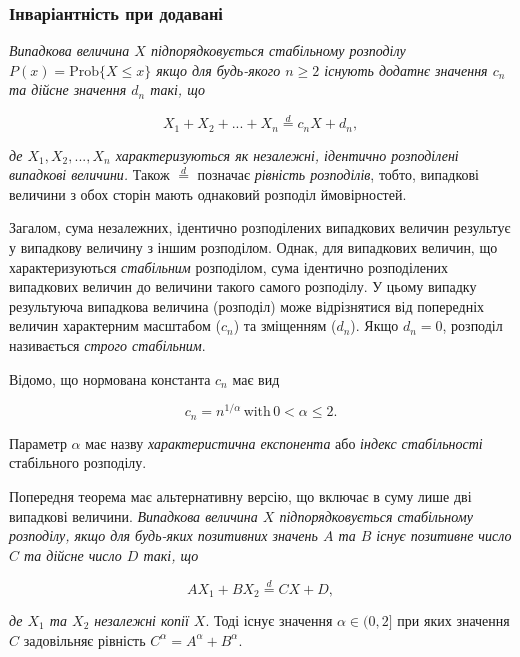 \documentclass[
  letterpaper,
]{report}
\begin{document}
\hypertarget{ux456ux43dux432ux430ux440ux456ux430ux43dux442ux43dux456ux441ux442ux44c-ux43fux440ux438-ux434ux43eux434ux430ux432ux430ux43dux456}{%
\subsubsection{Інваріантність при
додавані}\label{ux456ux43dux432ux430ux440ux456ux430ux43dux442ux43dux456ux441ux442ux44c-ux43fux440ux438-ux434ux43eux434ux430ux432ux430ux43dux456}}

\emph{Випадкова величина \(X\) підпорядковується стабільному розподілу
\(P(x) = \text{Prob}\{X \leq x\}\) якщо для будь-якого \(n \geq 2\)
існують додатнє значення \(c_{n}\) та дійсне значення \(d_{n}\) такі,
що}

\[ 
X_1 + X_2 + ... + X_n \stackrel{d}{=} c_{n}X + d_{n}, 
\]

\emph{де \(X_1, X_2, ..., X_n\) характеризуються як незалежні, ідентично
розподілені випадкові величини.} Також \(\stackrel{d}{=}\) позначає
\emph{рівність розподілів}, тобто, випадкові величини з обох сторін
мають однаковий розподіл ймовірностей.

Загалом, сума незалежних, ідентично розподілених випадкових величин
результує у випадкову величину з іншим розподілом. Однак, для випадкових
величин, що характеризуються \emph{стабільним} розподілом, сума
ідентично розподілених випадкових величин до величини такого самого
розподілу. У цьому випадку результуюча випадкова величина (розподіл)
може відрізнятися від попередніх величин характерним масштабом
(\(c_{n}\)) та зміщенням (\(d_{n}\)). Якщо \(d_{n} = 0\), розподіл
називається \emph{строго стабільним}.

Відомо, що нормована константа \(c_{n}\) має вид

\[
c_{n} = n^{1/\alpha} \, \text{with} \, 0 < \alpha \leq 2. 
\]

Параметр \(\alpha\) має назву \emph{характеристична експонента} або
\emph{індекс стабільності} стабільного розподілу.

Попередня теорема має альтернативну версію, що включає в суму лише дві
випадкові величини. \emph{Випадкова величина \(X\) підпорядковується
стабільному розподілу, якщо для будь-яких позитивних значень \(A\) та
\(B\) існує позитивне число \(C\) та дійсне число \(D\) такі, що}

\[ 
A X_1 + B X_2 \stackrel{d}{=} C X + D, 
\]

\emph{де \(X_1\) та \(X_2\) незалежні копії \(X\)}. Тоді існує значення
\(\alpha \in (0, 2]\) при яких значення \(C\) задовільняє рівність
\(C^{\alpha} = A^{\alpha} + B^{\alpha}\).
\end{document}
